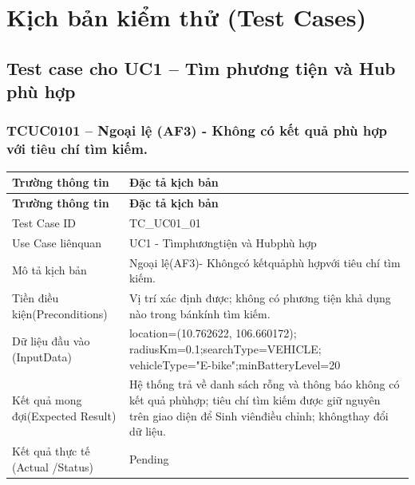 \vspace{-0.5\baselineskip}
\section{Kịch bản kiểm thử (Test Cases)}
\subsection{Test case cho UC1 – Tìm phương tiện và Hub phù hợp}
\subsubsection{TCUC0101 – Ngoại lệ (AF3) - Không có kết quả phù hợp với tiêu chí tìm kiếm.}
\begin{longtable}{|L{0.24\textwidth}|L{0.70\textwidth}|}
\hline
\textbf{Trường thông tin} & \textbf{Đặc tả kịch bản} \\
\hline
\endfirsthead
\hline
\textbf{Trường thông tin} & \textbf{Đặc tả kịch bản} \\
\hline
\endhead
Test Case ID & TC\_UC01\_01 \\
\hline
Use Case liênquan & UC1 - Tìmphươngtiện và Hubphù hợp \\
\hline
Mô tả kịch bản & Ngoại lệ(AF3)- Khôngcó kếtquảphù hợpvới tiêu chí tìm kiếm. \\
\hline
Tiền điều kiện\newline (Preconditions) & Vị trí xác định được; không có phương tiện khả dụng nào trong bán\newline kính tìm kiếm. \\
\hline
Dữ liệu đầu vào (Input\newline Data) & location=(10.762622, 106.660172); radiusKm=0.1;\newline searchType=VEHICLE; vehicleType="E-bike";\newline minBatteryLevel=20 \\
\hline
Kết quả mong đợi\newline (Expected Result) & Hệ thống trả về danh sách rỗng và thông báo không có kết quả phù\newline hợp; tiêu chí tìm kiếm được giữ nguyên trên giao diện để Sinh viên\newline điều chỉnh; khôngthay đổi dữ liệu. \\
\hline
Kết quả thực tế (Actual /\newline Status) & Pending \\
\hline
\end{longtable}
\vspace{-0.5\baselineskip}
